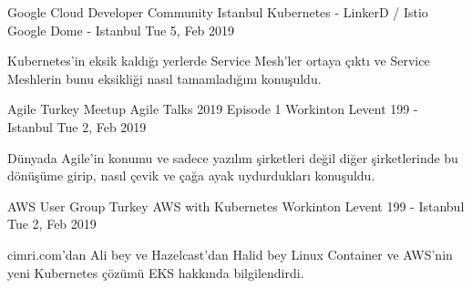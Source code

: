\begin{cventries}
    \cventry
    {Google Cloud Developer Community Istanbul}
    {Kubernetes - LinkerD / Istio}
    {Google Dome - Istanbul}
    {Tue 5, Feb 2019}
    {
      \begin{cvitems}
        \item{Kubernetes'in eksik kaldığı yerlerde Service Mesh'ler ortaya çıktı ve Service Meshlerin bunu eksikliği nasıl tamamladığını konuşuldu.}
      \end{cvitems}
    }
    
    \cventry
    {Agile Turkey Meetup}
    {Agile Talks 2019 Episode 1}
    {Workinton Levent 199 - Istanbul}
    {Tue 2, Feb 2019}
    {
      \begin{cvitems}
        \item{Dünyada Agile'in konumu ve sadece yazılım şirketleri değil diğer şirketlerinde bu dönüşüme girip, nasıl çevik ve çağa ayak uydurdukları konuşuldu.}
      \end{cvitems}
    }
    
    \cventry
    {AWS User Group Turkey}
    {AWS with Kubernetes}
    {Workinton Levent 199 - Istanbul}
    {Tue 2, Feb 2019}
    {
      \begin{cvitems}
        \item{cimri.com'dan Ali bey ve Hazelcast'dan Halid bey Linux Container ve AWS'nin yeni Kubernetes çözümü EKS hakkında bilgilendirdi.}
      \end{cvitems}
    }
\end{cventries}
